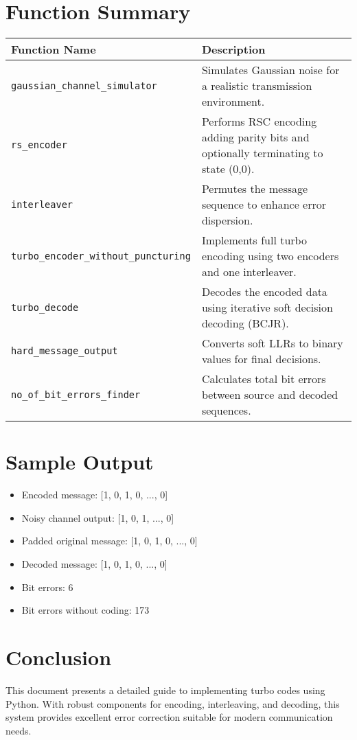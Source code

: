 \documentclass[12pt]{article}
\begin{document}
\section*{Function Summary}
\begin{tabular}{|l|p{10cm}|}
\hline
\textbf{Function Name} & \textbf{Description} \\
\hline
\texttt{gaussian\_channel\_simulator} & Simulates Gaussian noise for a realistic transmission environment. \\
\texttt{rs\_encoder} & Performs RSC encoding adding parity bits and optionally terminating to state (0,0). \\
\texttt{interleaver} & Permutes the message sequence to enhance error dispersion. \\
\texttt{turbo\_encoder\_without\_puncturing} & Implements full turbo encoding using two encoders and one interleaver. \\
\texttt{turbo\_decode} & Decodes the encoded data using iterative soft decision decoding (BCJR). \\
\texttt{hard\_message\_output} & Converts soft LLRs to binary values for final decisions. \\
\texttt{no\_of\_bit\_errors\_finder} & Calculates total bit errors between source and decoded sequences. \\
\hline
\end{tabular}

\section*{Sample Output}
\begin{itemize}
  \item Encoded message: [1, 0, 1, 0, ..., 0]
  \item Noisy channel output: [1, 0, 1, ..., 0]
  \item Padded original message: [1, 0, 1, 0, ..., 0]
  \item Decoded message: [1, 0, 1, 0, ..., 0]
  \item Bit errors: 6
  \item Bit errors without coding: 173
\end{itemize}

\section*{Conclusion}
This document presents a detailed guide to implementing turbo codes using Python. With robust components for encoding, interleaving, and decoding, this system provides excellent error correction suitable for modern communication needs.
\end{document}
